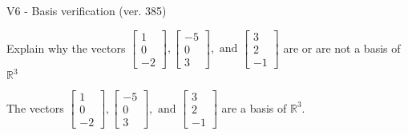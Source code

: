 \begin{exercise}
  \begin{exerciseTitle}V6 - Basis verification (ver. 385)\end{exerciseTitle}
  \begin{exerciseStatement}
    Explain why the vectors \(\left[\begin{array}{r}
1 \\
0 \\
-2
\end{array}\right] , \left[\begin{array}{r}
-5 \\
0 \\
3
\end{array}\right] , \text{ and } \left[\begin{array}{r}
3 \\
2 \\
-1
\end{array}\right]\) are or are not a basis of \(\mathbb{R}^3\)	


  \end{exerciseStatement}
  \begin{exerciseAnswer}
   The vectors \(\left[\begin{array}{r}
1 \\
0 \\
-2
\end{array}\right] , \left[\begin{array}{r}
-5 \\
0 \\
3
\end{array}\right] , \text{ and } \left[\begin{array}{r}
3 \\
2 \\
-1
\end{array}\right]\) 
  	 are  a basis of \(\mathbb{R}^3\).
  


  \end{exerciseAnswer}
\end{exercise}